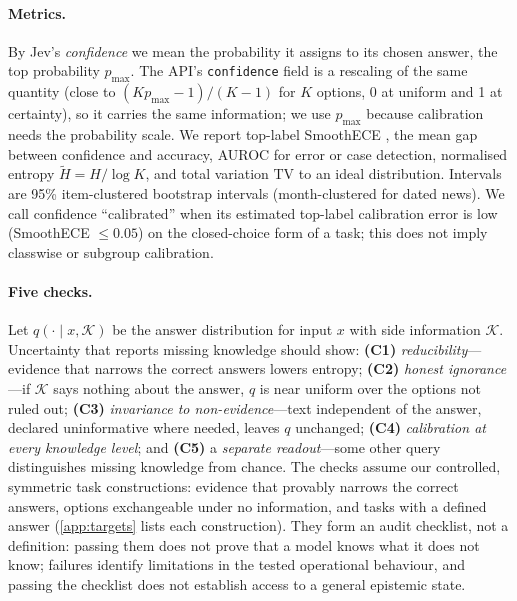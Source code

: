 \documentclass[10pt,twocolumn]{article}
\newcommand{\pmax}{p_{\max}}
\newcommand{\Hn}{\tilde{H}}
\newcommand{\TV}{\mathrm{TV}}
\begin{document}
\paragraph{Metrics.} By Jev's \emph{confidence} we mean the probability it
assigns to its chosen answer, the top probability $\pmax$. The API's
\texttt{confidence} field is a rescaling of the same quantity (close to
$(K\pmax-1)/(K-1)$ for $K$ options, 0 at uniform and 1 at certainty), so it
carries the same information; we use $\pmax$ because calibration needs the
probability scale. We report top-label SmoothECE
\citep{blasiok2024smooth}, the mean gap between confidence and accuracy,
AUROC for error or case detection, normalised entropy $\Hn=H/\log K$, and total
variation $\TV$ to an ideal distribution. Intervals are 95\% item-clustered
bootstrap intervals (month-clustered for dated news). We call confidence
``calibrated'' when its estimated top-label calibration error is low
(SmoothECE $\le 0.05$) on the closed-choice form of a task; this does not imply
classwise or subgroup calibration.

\paragraph{Five checks.}
Let $q(\cdot\mid x,\mathcal K)$ be the answer distribution for input $x$ with
side information $\mathcal K$. Uncertainty that reports missing knowledge
should show: \textbf{(C1)} \emph{reducibility}---evidence that narrows the
correct answers lowers entropy; \textbf{(C2)} \emph{honest
ignorance}---if $\mathcal K$ says nothing about the answer, $q$ is near uniform
over the options not ruled out; \textbf{(C3)} \emph{invariance to
non-evidence}---text independent of the answer, declared uninformative where
needed, leaves $q$ unchanged; \textbf{(C4)} \emph{calibration at every
knowledge level}; and \textbf{(C5)} a \emph{separate readout}---some other
query distinguishes missing knowledge from chance. The checks assume our
controlled, symmetric task constructions: evidence that provably narrows the
correct answers, options exchangeable under no information, and tasks with a
defined answer (\cref{app:targets} lists each construction). They form an audit checklist, not a definition: passing them does not prove that a model knows
what it does not know; failures identify limitations in the tested
operational behaviour, and passing the checklist does not establish access to
a general epistemic state.
\end{document}
